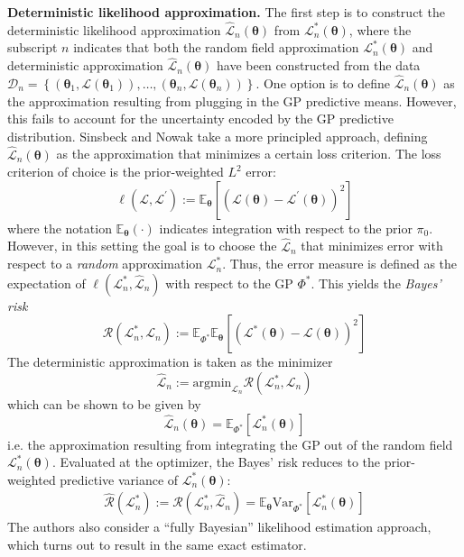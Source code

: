 \documentclass[12pt]{article}
\newcommand{\E}{\mathbb{E}}
\newcommand{\Var}{\mathrm{Var}}
\newcommand{\btheta}{\boldsymbol{\theta}}
\begin{document}
\bigskip
\noindent
\textbf{Deterministic likelihood approximation.}
The first step is to construct the deterministic likelihood approximation $\hat{\mathcal{L}}_n(\btheta)$ from 
$\mathcal{L}^*_n(\btheta)$, where the subscript $n$ indicates that both the random field approximation $\mathcal{L}^*_n(\btheta)$ and deterministic approximation $\hat{\mathcal{L}}_n(\btheta)$ have been constructed from the data 
$\mathcal{D}_n = \left\{(\btheta_1, \mathcal{L}(\btheta_1)), \dots, (\btheta_n, \mathcal{L}(\btheta_n)) \right\}$. One option is to define $\hat{\mathcal{L}}_n(\btheta)$ as the approximation resulting from plugging in the GP predictive 
means. However, this fails to account for the uncertainty encoded by the GP predictive distribution. Sinsbeck and Nowak take a more principled approach, defining $\hat{\mathcal{L}}_n(\btheta)$ as the approximation that minimizes 
a certain loss criterion. The loss criterion of choice is the prior-weighted $L^2$ error:
\[\ell(\mathcal{L}, \mathcal{L}^\prime) := \E_{\btheta}\left[\left(\mathcal{L}(\btheta) - \mathcal{L}^\prime(\btheta) \right)^2 \right]\]
where the notation $\E_{\btheta}(\cdot)$ indicates integration with respect to the prior $\pi_0$. 
However, in this setting the goal is to choose the $\hat{\mathcal{L}}_n$ that minimizes error with respect to a \textit{random} approximation $\mathcal{L}_n^*$. Thus, the error measure is defined as the 
expectation of $\ell(\mathcal{L}^*_n, \hat{\mathcal{L}}_n)$ with respect to the GP $\Phi^*$. This yields the \textit{Bayes' risk}
\[\mathcal{R}(\mathcal{L}_n^*, \mathcal{L}_n) := \E_{\Phi^*} \E_{\btheta} \left[\left(\mathcal{L}^*(\btheta) - \mathcal{L}(\btheta) \right)^2 \right] \]
The deterministic approximation is taken as the minimizer  
\[\hat{\mathcal{L}}_n := \text{argmin}_{\mathcal{L}_n} \mathcal{R}(\mathcal{L}_n^*, \mathcal{L}_n) \]
which can be shown to be given by 
\[\hat{\mathcal{L}}_n(\btheta) = \E_{\Phi^*}\left[\mathcal{L}_n^*(\btheta) \right]\]
i.e. the approximation resulting from integrating the GP out of the random field $\mathcal{L}_n^*(\btheta)$. Evaluated at the optimizer, the Bayes' risk reduces to the prior-weighted predictive variance 
of $\mathcal{L}_n^*(\btheta)$: 
\begin{align}
\hat{\mathcal{R}}(\mathcal{L}_n^*) := \mathcal{R}(\mathcal{L}_n^*, \hat{\mathcal{L}}_n) = \E_{\btheta} \Var_{\Phi^*}\left[\mathcal{L}_n^*(\btheta)\right] \label{Bayes_Risk}
\end{align}
The authors also consider a ``fully Bayesian'' likelihood estimation approach, which turns out to result in the same exact estimator. 
\end{document}
